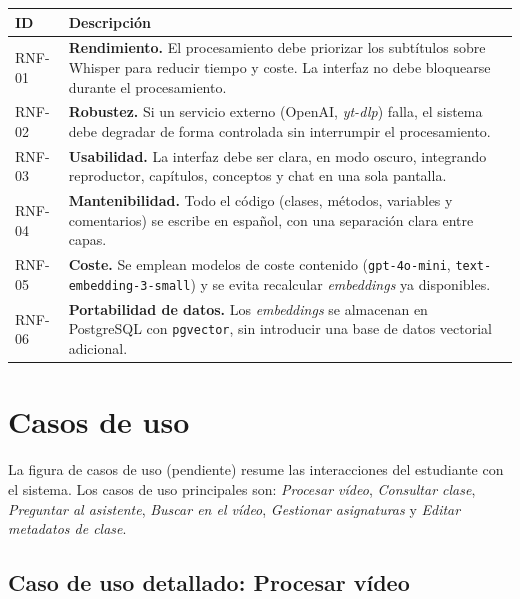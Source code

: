 \begin{longtable}{p{2cm}p{11.5cm}}
  \toprule
  \textbf{ID} & \textbf{Descripción} \\
  \midrule
  \endhead
  RNF-01 & \textbf{Rendimiento.} El procesamiento debe priorizar los subtítulos sobre Whisper para
           reducir tiempo y coste. La interfaz no debe bloquearse durante el procesamiento. \\
  RNF-02 & \textbf{Robustez.} Si un servicio externo (OpenAI, \textit{yt-dlp}) falla, el sistema
           debe degradar de forma controlada sin interrumpir el procesamiento. \\
  RNF-03 & \textbf{Usabilidad.} La interfaz debe ser clara, en modo oscuro, integrando reproductor,
           capítulos, conceptos y chat en una sola pantalla. \\
  RNF-04 & \textbf{Mantenibilidad.} Todo el código (clases, métodos, variables y comentarios) se
           escribe en español, con una separación clara entre capas. \\
  RNF-05 & \textbf{Coste.} Se emplean modelos de coste contenido (\texttt{gpt-4o-mini},
           \texttt{text-embedding-3-small}) y se evita recalcular \textit{embeddings} ya disponibles. \\
  RNF-06 & \textbf{Portabilidad de datos.} Los \textit{embeddings} se almacenan en PostgreSQL con
           \texttt{pgvector}, sin introducir una base de datos vectorial adicional. \\
  \bottomrule
\end{longtable}

\section{Casos de uso}

La figura de casos de uso (pendiente) resume las interacciones del estudiante con el sistema. Los
casos de uso principales son: \textit{Procesar vídeo}, \textit{Consultar clase}, \textit{Preguntar
al asistente}, \textit{Buscar en el vídeo}, \textit{Gestionar asignaturas} y \textit{Editar
metadatos de clase}.

\subsection{Caso de uso detallado: Procesar vídeo}

